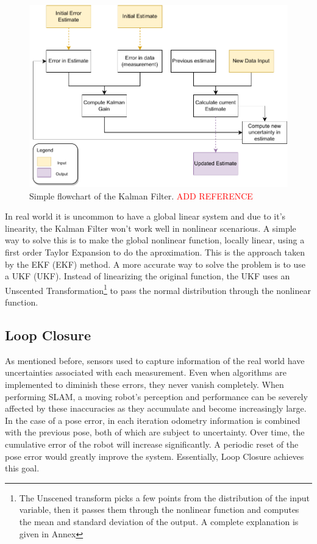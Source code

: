 \begin{figure}[H]
    \centering
    \includegraphics[width=0.6\linewidth]{images/background/Kalman-diagram.pdf}
    \caption{Simple flowchart of the Kalman Filter. \textcolor{red}{ADD REFERENCE}}
    \label{fig: flowchart kalman}
\end{figure}

In real world it is uncommon to have a global linear system and due to it's linearity, the Kalman Filter won't work well in nonlinear scenarious. A simple way to solve this is to make the global nonlinear function, locally linear, using a first order Taylor Expansion to do the aproximation. This is the approach taken by the \acl{EKF} (\acs*{EKF}) method. A more accurate way to solve the problem is to use a \acl*{UKF} (\acs*{UKF}). Instead of linearizing the original function, the \acs*{UKF} uses an Unscented Transformation\footnote{The Unscened transform picks a few points from the distribution of the input variable, then it passes them through the nonlinear function and computes the mean and standard deviation of the output. A complete explanation is given in Annex} to pass the normal distribution through the nonlinear function.

\subsection{Loop Closure}

As mentioned before, sensors used to capture information of the real world have uncertainties associated with each measurement. Even when algorithms are implemented to diminish these errors, they never vanish completely. When performing \acs*{SLAM}, a moving robot's perception and performance can be severely affected by these inaccuracies as they accumulate and become increasingly large. In the case of a pose error, in each iteration odometry information is combined with the previous pose, both of which are subject to uncertainty. Over time, the cumulative error of the robot will increase significantly. A periodic reset of the pose error would greatly improve the system. Essentially, Loop Closure achieves this goal.

